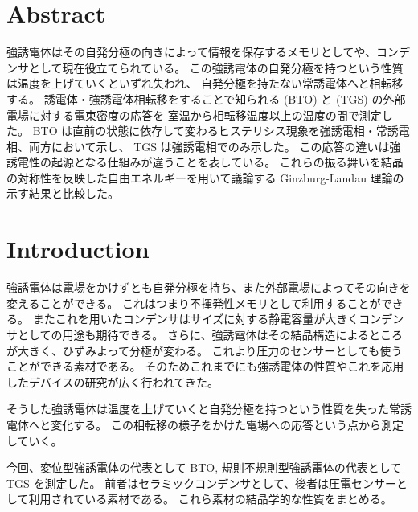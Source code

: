 \documentclass[11pt,dvipdfmx,a4paper]{jsarticle}
\begin{document}

\section{Abstract}
強誘電体はその自発分極の向きによって情報を保存するメモリとしてや、コンデンサとして現在役立てられている。
この強誘電体の自発分極を持つという性質は温度を上げていくといずれ失われ、
自発分極を持たない常誘電体へと相転移する。
誘電体・強誘電体相転移をすることで知られる
 (BTO) と  (TGS) の外部電場に対する電束密度の応答を
室温から相転移温度以上の温度の間で測定した。
BTO は直前の状態に依存して変わるヒステリシス現象を強誘電相・常誘電相、両方において示し、
TGS は強誘電相でのみ示した。
この応答の違いは強誘電性の起源となる仕組みが違うことを表している。
これらの振る舞いを結晶の対称性を反映した自由エネルギーを用いて議論する
Ginzburg-Landau 理論の示す結果と比較した。

\section{Introduction}
強誘電体は電場をかけずとも自発分極を持ち、また外部電場によってその向きを変えることができる。
これはつまり不揮発性メモリとして利用することができる。
またこれを用いたコンデンサはサイズに対する静電容量が大きくコンデンサとしての用途も期待できる。
さらに、強誘電体はその結晶構造によるところが大きく、ひずみよって分極が変わる。
これより圧力のセンサーとしても使うことができる素材である。
そのためこれまでにも強誘電体の性質やこれを応用したデバイスの研究が広く行われてきた。

そうした強誘電体は温度を上げていくと自発分極を持つという性質を失った常誘電体へと変化する。
この相転移の様子をかけた電場への応答という点から測定していく。

今回、変位型強誘電体の代表として BTO, 規則不規則型強誘電体の代表として TGS を測定した。
前者はセラミックコンデンサとして、後者は圧電センサーとして利用されている素材である。
これら素材の結晶学的な性質をまとめる。
\end{document}
